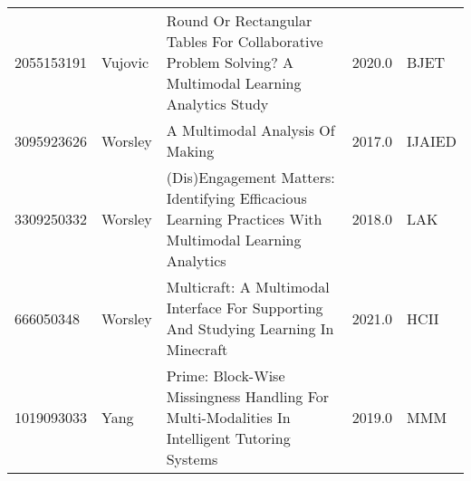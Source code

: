 \begin{landscape}
\begin{longtable}{llp{4in}rl}
2055153191 \cite{2055153191} & Vujovic & Round Or Rectangular Tables For Collaborative Problem Solving? A Multimodal Learning Analytics Study & 2020.0 & BJET \\
3095923626 \cite{3095923626} & Worsley & A Multimodal Analysis Of Making & 2017.0 & IJAIED \\
3309250332 \cite{3309250332} & Worsley & (Dis)Engagement Matters: Identifying Efficacious Learning Practices With Multimodal Learning Analytics & 2018.0 & LAK \\
666050348 \cite{666050348} & Worsley & Multicraft: A Multimodal Interface For Supporting And Studying Learning In Minecraft & 2021.0 & HCII \\
1019093033 \cite{1019093033} & Yang & Prime: Block-Wise Missingness Handling For Multi-Modalities In Intelligent Tutoring Systems & 2019.0 & MMM \\
\bottomrule
\end{longtable}
\end{landscape}
